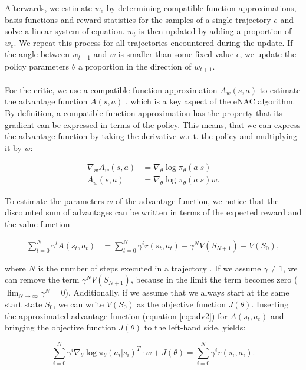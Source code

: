Afterwards, we estimate $w_e$ by determining compatible function approximations, basis functions and reward statistics for the samples of a single trajectory $e$ and solve a linear system of equation. $w_t$ is then updated by adding a proportion of $w_e$. We repeat this process for all trajectories encountered during the update. If the angle between $w_{t+1}$ and $w$ is smaller than some fixed value $\epsilon$, we update the policy parameters $\theta$ a proportion in the direction of $w_{t+1}$.
\\\\
 For the critic, we use a compatible function approximation $A_w(s, a)$ to estimate the advantage function $A(s, a)$ \citep{sutton2000policy}, which is a key aspect of the eNAC algorithm. By definition, a compatible function approximation has the property that its gradient can be expressed in terms of the policy. This means, that we can express the advantage function by taking the derivative w.r.t. the policy and multiplying it by $w$:

\begin{align}
\nabla_w A_w(s,a) &= \nabla_{\theta} \log \pi_{\theta}(a|s)\label{eq:adv1}\\
A_w(s,a) &= \nabla_{\theta} \log \pi_{\theta}(a|s)w. \label{eq:adv2}
\end{align}

\noindent To estimate the parameters $w$ of the advantage function, we notice that the discounted sum of advantages can be written in terms of the expected reward and the value function

\begin{align}
\sum_{t = 0}^{N}\gamma^t A(s_t, a_t) &= \sum_{t = 0}^{N}\gamma^i r(s_t, a_t) + \gamma^N V(S_{N+1}) - V(S_0),
\end{align}

\noindent where $N$ is the number of steps executed in a trajectory \citep{peters2005natural}. If we assume $\gamma \neq 1$, we can remove the term $\gamma^N V(S_{N+1})$, because in the limit the term becomes zero ($\lim_{N \rightarrow \infty}\gamma^N = 0$). Additionally, if we assume that we always start at the same start state $S_0$, we can write $V(S_0)$ as the objective function $J(\theta)$. Inserting the approximated advantage function (equation \ref{eq:adv2}) for $A(s_t, a_t)$ and bringing the objective function $J(\theta)$ to the left-hand side, yields:

\begin{equation}
	\sum_{i = 0}^{N} \gamma^i \nabla_{\theta} \log \pi_{\theta}(a_i | s_i)^T \cdot w + J(\theta) = \sum_{i = 0}^{N}\gamma^i r(s_i, a_i).
\end{equation}

